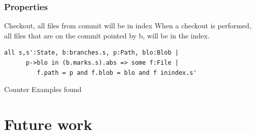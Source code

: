 \documentclass{beamer}
\begin{document}
\begin{frame}[fragile]
	\frametitle{Properties}
	\begin{block}{Checkout, all files from commit will be in index}
      When a checkout is performed, all files that are on the commit
      pointed by b, will be in the index.
   \end{block}
	\scriptsize
	\begin{lstlisting}
all s,s':State, b:branches.s, p:Path, blo:Blob | 
      p->blo in (b.marks.s).abs => some f:File | 
         f.path = p and f.blob = blo and f inindex.s'
	\end{lstlisting}\pause
   \Large
   \color{red}
   \center
   Counter Examples found
\end{frame}

\section{Future work}


\frame{
   \titlepage
}
\end{document}
